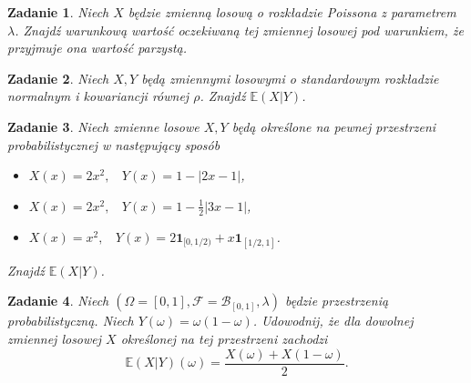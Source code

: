 \documentclass{mwart}
\newtheorem{zd}{Zadanie}
\begin{document}
\begin{zd}
	Niech $X$ będzie zmienną losową o rozkładzie Poissona z parametrem $\lambda$. Znajdź warunkową wartość oczekiwaną tej zmiennej losowej pod warunkiem, że przyjmuje ona wartość parzystą.
\end{zd}

\begin{zd}
	Niech $X,Y$ będą zmiennymi losowymi o standardowym rozkładzie normalnym i kowariancji równej $\rho$. Znajdź $\mathbb{E}(X|Y)$.
\end{zd}

\begin{zd}
	Niech zmienne losowe $X,Y$ będą określone na pewnej przestrzeni probabilistycznej w następujący sposób
	\begin{itemize}
	\item $X(x) = 2x^2,\ \ \ \ Y(x) = 1 - |2x - 1|$,
	\item $X(x) = 2x^2, \ \ \ \ Y(x) = 1 - \frac{1}{2}\left|3x-1\right|$,
	\item $X(x) = x^2, \ \ \ \ Y(x) = 2\pmb{1}_{[0, 1/2)} + x\pmb{1}_{[1/2, 1]}$.
	\end{itemize}
	Znajdź $\mathbb{E}(X|Y)$.
\end{zd}

\begin{zd}
	Niech $(\Omega = [0,1], \mathcal{F} = \mathcal{B}_{[0,1]}, \lambda)$ będzie przestrzenią probabilistyczną. Niech $Y(\omega) = \omega(1-\omega)$. Udowodnij, że dla dowolnej zmiennej losowej $X$ określonej na tej przestrzeni zachodzi
	\begin{displaymath}
	 \mathbb{E}(X|Y)(\omega) = \frac{X(\omega) + X(1-\omega)}{2}.
	\end{displaymath}
\end{zd}
\end{document}
